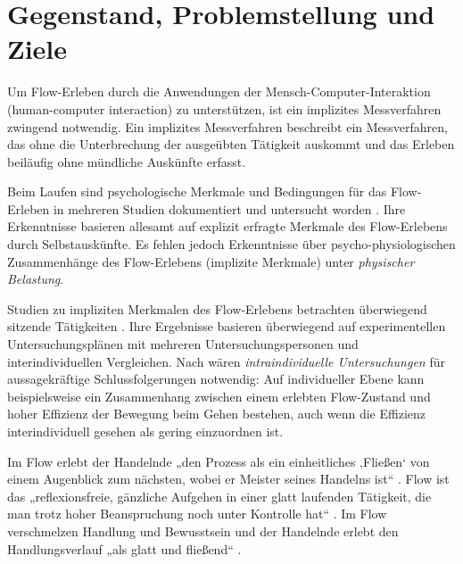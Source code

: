 

\section{Gegenstand, Problemstellung und Ziele} 

\label{sec:gegenstand_problemstellung_und_ziele}

Um Flow-Erleben durch die Anwendungen der Mensch-Computer-Interaktion (human-computer interaction) zu unterstützen, ist ein implizites Messverfahren zwingend notwendig. Ein implizites Messverfahren beschreibt ein Messverfahren, das ohne die Unterbrechung der ausgeübten Tätigkeit auskommt und das Erleben beiläufig ohne mündliche Auskünfte erfasst.

Beim Laufen sind psychologische Merkmale und Bedingungen für das Flow-Erleben in mehreren Studien dokumentiert und untersucht worden \citep{Stoll2005, Reinhardt2006, Schuler2009, Jimenez-Torres2013}. Ihre Erkenntnisse basieren allesamt auf explizit erfragte Merkmale des Flow-Erlebens durch Selbstauskünfte. Es fehlen jedoch Erkenntnisse über psycho-physiologischen Zusammenhänge des Flow-Erlebens (implizite Merkmale) unter \emph{physischer Belastung}. 

Studien zu impliziten Merkmalen des Flow-Erlebens betrachten überwiegend sitzende Tätigkeiten \citep{deManzano2010, Keller2011, Peifer2014, Tozman2015, Harmat2015}. Ihre Ergebnisse basieren überwiegend auf experimentellen Untersuchungsplänen mit mehreren Untersuchungspersonen und interindividuellen Vergleichen. Nach \citet[][S.77]{Henk2014} wären \emph{intraindividuelle Untersuchungen} für aussagekräftige Schlussfolgerungen notwendig: Auf individueller Ebene kann beispielsweise ein Zusammenhang zwischen einem erlebten Flow-Zustand und hoher Effizienz der Bewegung beim Gehen bestehen, auch wenn die Effizienz interindividuell gesehen als gering einzuordnen ist.

Im Flow erlebt der Handelnde „den Prozess als ein einheitliches ‚Fließen‘ von einem Augenblick zum nächsten, wobei er Meister seines Handelns ist“ \citep[][S.~59]{Csikszentmihalyi2010}. Flow ist das „reflexionsfreie, gänzliche Aufgehen in einer glatt laufenden Tätigkeit, die man trotz hoher Beanspruchung noch unter Kontrolle hat“ \citep[][S.~156]{Rheinberg2003}. Im Flow verschmelzen Handlung und Bewusstsein und der Handelnde erlebt den Handlungsverlauf „als glatt und fließend“ \citep[][S.~13]{Henk2014}.

